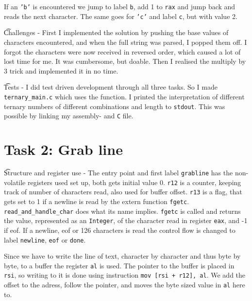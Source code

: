    If an \texttt{'b'} is encountered we jump to label \texttt{b}, add 1 to \texttt{rax} and jump
    back and reads the next character. The same goes for \texttt{'c'} and label
    \texttt{c}, but
    with value 2.

\t{Challenges} - First I implemented the solution by pushing the base values of
characters encountered, and when the full string was parsed, I
popped them off. I forgot the characters were now received in reversed order,
which caused a lot of lost time for me. It was cumbersome, but doable. Then I realised the
multiply by 3 trick and implemented it in no time.

\t{Tests} - I did test driven development through all three tasks. So I
made \texttt{ternary\_main.c} which uses the function.  I printed the
interpretation of different ternary numbers of different
combinations and length to \texttt{stdout}. This was possible by linking my
assembly- and \texttt{C} file.

\section*{Task 2: Grab line}
\t{Structure and register use} -
The entry point and first label
\texttt{grabline} has the non-volatile registers used set up, both gets initial
value 0.  \texttt{r12} is a counter, keeping track of number of characters
read, also used for buffer offset.  \texttt{r13} is a flag, that gets set to 1
if a newline is read by the extern function \texttt{fgetc}.
    \texttt{read\_and\_handle\_char} does what its name implies.
    \texttt{fgetc} is called and returns the value, represented as an
    \texttt{Integer}, of the character read in register \texttt{eax}, and -1 if
    eof. If a newline, eof or 126 characters is read the control flow is
    changed to label \texttt{newline}, \texttt{eof} or \texttt{done}.

    Since we have to write the line of text, character by character and thus
    byte by byte, to a buffer the register \texttt{al} is used. The pointer to
    the buffer is placed in \texttt{rsi}, so writing to it is done using
    instruction \texttt{mov [rsi + r12], al}. We add the offset to the adress,
    follow the pointer, and moves the byte sized value in \texttt{al} here to.

